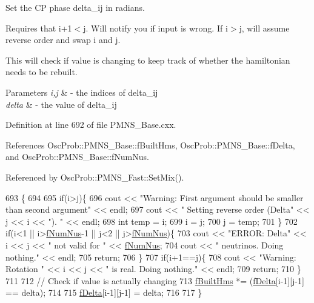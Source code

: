 Set the CP phase delta\+\_\+ij in radians.

Requires that i+1$<$j. Will notify you if input is wrong. If i$>$j, will assume reverse order and swap i and j.

This will check if value is changing to keep track of whether the hamiltonian needs to be rebuilt.


\begin{DoxyParams}{Parameters}
{\em i,j} & -\/ the indices of delta\+\_\+ij \\
\hline
{\em delta} & -\/ the value of delta\+\_\+ij \\
\hline
\end{DoxyParams}


Definition at line 692 of file P\+M\+N\+S\+\_\+\+Base.\+cxx.



References Osc\+Prob\+::\+P\+M\+N\+S\+\_\+\+Base\+::f\+Built\+Hms, Osc\+Prob\+::\+P\+M\+N\+S\+\_\+\+Base\+::f\+Delta, and Osc\+Prob\+::\+P\+M\+N\+S\+\_\+\+Base\+::f\+Num\+Nus.



Referenced by Osc\+Prob\+::\+P\+M\+N\+S\+\_\+\+Fast\+::\+Set\+Mix().


\begin{DoxyCode}
693 \{
694 
695   \textcolor{keywordflow}{if}(i>j)\{
696     cout << \textcolor{stringliteral}{"Warning: First argument should be smaller than second argument"} << endl;
697     cout << \textcolor{stringliteral}{"         Setting reverse order (Delta"} << j << i << \textcolor{stringliteral}{"). "} << endl;
698     \textcolor{keywordtype}{int} temp = i;
699     i = j;
700     j = temp;
701   \}
702   \textcolor{keywordflow}{if}(i<1 || i>\hyperlink{classOscProb_1_1PMNS__Base_a24bb74bed63569dfe88b18fa6a08060e}{fNumNus}-1 || j<2 || j>\hyperlink{classOscProb_1_1PMNS__Base_a24bb74bed63569dfe88b18fa6a08060e}{fNumNus})\{
703     cout << \textcolor{stringliteral}{"ERROR: Delta"} << i << j << \textcolor{stringliteral}{" not valid for "} << \hyperlink{classOscProb_1_1PMNS__Base_a24bb74bed63569dfe88b18fa6a08060e}{fNumNus};
704     cout << \textcolor{stringliteral}{" neutrinos. Doing nothing."} << endl;
705     \textcolor{keywordflow}{return};
706   \}
707   \textcolor{keywordflow}{if}(i+1==j)\{
708     cout << \textcolor{stringliteral}{"Warning: Rotation "} << i << j << \textcolor{stringliteral}{" is real. Doing nothing."} << endl;
709     \textcolor{keywordflow}{return};
710   \}
711 
712   \textcolor{comment}{// Check if value is actually changing}
713   \hyperlink{classOscProb_1_1PMNS__Base_a9ac3cadeac8db1b90f3152f476244780}{fBuiltHms} *= (\hyperlink{classOscProb_1_1PMNS__Base_ab2a5fa40e689b221c8a7d2c17213810d}{fDelta}[i-1][j-1] == delta);
714 
715   \hyperlink{classOscProb_1_1PMNS__Base_ab2a5fa40e689b221c8a7d2c17213810d}{fDelta}[i-1][j-1] = delta;
716 
717 \}
\end{DoxyCode}
\mbox{\label{classOscProb_1_1PMNS__Fast_a63733b246e6d2e609ce3de7a65ba5b9f}} 
